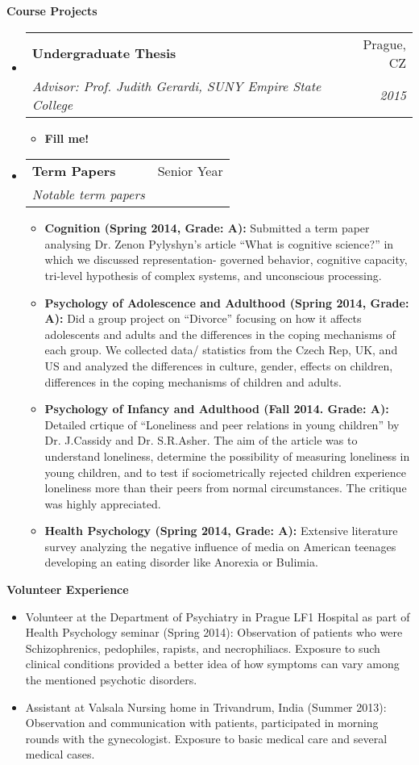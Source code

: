 \documentclass[letterpaper,11pt]{article}
\makeatletter
\newcommand{\resheading}[1]{{\large \colorbox{mygrey}{\begin{minipage}{\textwidth}{\textbf{#1 \vphantom{p\^{E}}}}\end{minipage}}}}
\newcommand{\ressubheading}[4]{
\begin{tabular*}{7.0in}{l@{\extracolsep{\fill}}r}
      \textbf{#1} & #2 \\
            \textit{#3} & \textit{#4} \\
\end{tabular*}\vspace{-6pt}}
\makeatother
\begin{document}
\resheading{Course Projects}
\begin{itemize}

\item
    \ressubheading{Undergraduate Thesis}{Prague, CZ}{Advisor: Prof. Judith Gerardi, SUNY Empire State College}{2015}
      \begin{itemize}
            \item{\textbf{Fill me!}}
      \end{itemize}


\item
    \ressubheading{Term Papers}{Senior Year}{Notable term papers}{}
      \begin{itemize}
            \item{\textbf{Cognition (Spring 2014, Grade: A):} Submitted a term paper analysing Dr. Zenon Pylyshyn’s article ``What is cognitive science?'' in which we discussed representation- governed behavior, cognitive capacity, tri-level hypothesis of complex systems, and unconscious processing.}
            \item{\textbf{Psychology of Adolescence and Adulthood (Spring 2014, Grade: A):} Did a group project on ``Divorce'' focusing on how it affects adolescents and adults and the differences in the coping mechanisms of each group. We collected data/ statistics from the Czech Rep, UK, and US and analyzed the differences in culture, gender, effects on children, differences in the coping mechanisms of children and adults.}
            \item{\textbf{Psychology of Infancy and Adulthood (Fall 2014. Grade: A):} Detailed crtique of ``Loneliness and peer relations in young children'' by Dr. J.Cassidy and Dr. S.R.Asher. The aim of the article was to understand loneliness, determine the possibility of measuring loneliness in young children, and to test if sociometrically rejected children experience loneliness more than their peers from normal circumstances. The critique was highly appreciated.}
            \item{\textbf{Health Psychology (Spring 2014, Grade: A):} Extensive literature survey analyzing the negative influence of media on American teenages developing an eating disorder like Anorexia or Bulimia.} 
      \end{itemize}

\end{itemize}


\resheading{Volunteer Experience}
\begin{itemize}
\item{Volunteer at the Department of Psychiatry in Prague LF1 Hospital as part of Health Psychology seminar (Spring 2014): Observation of patients who were Schizophrenics, pedophiles, rapists, and necrophiliacs. Exposure to such clinical conditions provided a better idea of how symptoms can vary among the mentioned psychotic disorders.}

\item{Assistant at Valsala Nursing home in Trivandrum, India (Summer 2013): Observation and communication with patients, participated in morning rounds with the gynecologist. Exposure to basic medical care and several medical cases.}
\end{itemize}
\end{document}
